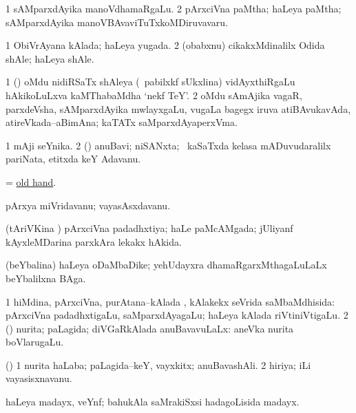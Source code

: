 \bentry
{}
\gl{\nA}
\bmng
\bnum
\num{1} sAMparxdAyika manoVdhamaRgaLu. 
\num{2} pArxciVna paMtha; haLeya paMtha; sAMparxdAyika manoVBAvaviTuTxkoMDiruvavaru. 
\enum
\emng

\noindent
\gl{\pagu}
\bmng
\bnum
\num{1}  ObiVrAyana kAlada; haLeya yugada. 
\num{2}  (obabxnu) cikakxMdinalilx Odida shAle; haLeya shAle. 
\enum
\emng
\eentry

\bentry
{}
\gl{\nA}
\bmng
\bnum
\num{1} (\birx) oMdu nidiRSaTx shAleya (\sA\ pabilxkf sUkxlina) vidAyxthiRgaLu hAkikoLuLxva kaMThabaMdha `nekf TeY'. 
\num{2} oMdu sAmAjika vagaR, parxdeVsha, sAMparxdAyika mwlayxgaLu, \mo vugaLa bagegx iruva atiBAvukavAda, atireVkada--aBimAna; kaTATx saMparxdAyaperxVma. 
\enum
\emng
\eentry

\bentry
{}
\gl{\nA}
\bmng
\bnum
\num{1} mAji seYnika. 
\num{2} (\rUpa) anuBavi; niSANxta; \kanmu\ kaSaTxda kelasa mADuvudaralilx pariNata, etitxda keY Adavanu. 
\enum
\emng
\eentry

\bentry
{}
\gl{\nA}
\bmng
= \hyperlink{old hand}{old hand}. 
\emng
\eentry

\bentry
{}
\gl{\nA}
\bmng
pArxya miVridavanu; vayasAsxdavanu. 
\emng
\eentry

\bentry
{}
\gl{\gu}
\bmng
(tAriVKina \vi) pArxciVna padadhxtiya; haLe paMcAMgada; jUliyanf kAyxleMDarina parxkAra lekakx hAkida. 
\emng
\eentry

\bentry
{}
\gl{\nA}
\bmng
(beYbalina) haLeya oDaMbaDike; yehUdayxra dhamaRgarxMthagaLuLaLx beYbalilxna BAga. 
\emng
\eentry

\bentry
{}
\gl{\gu}
\bmng
\bnum
\num{1} hiMdina, pArxciVna, purAtana--kAlada , kAlakekx seVrida saMbaMdhisida:  pArxciVna padadhxtigaLu, saMparxdAyagaLu; haLeya kAlada riVtiniVtigaLu. 
\num{2} (\ame) nurita; paLagida; diVGaRkAlada anuBavavuLaLx:  aneVka nurita boVlarugaLu. 
\enum
\emng
\eentry

\bentry
{}
\gl{\nA}
\bmng
(\ame) 
\bnum
\num{1} nurita haLaba; paLagida--keY, vayxkitx; anuBavashAli. 
\num{2} hiriya; iLi vayasisxnavanu. 
\enum
\emng
\eentry

\bentry
{}
\gl{\nA}
\bmng
haLeya madayx, veYnf; bahukAla saMrakiSxsi hadagoLisida madayx. 
\emng
\eentry

